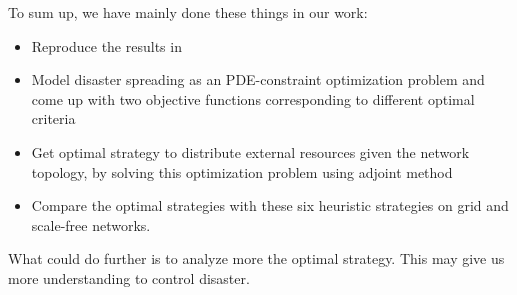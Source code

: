 To sum up, we have mainly done these things in our work:
\begin{itemize}
	\item Reproduce the results in \cite{buzna2007efficient}
	\item Model disaster spreading as an PDE-constraint optimization problem and come up with two objective functions corresponding to different optimal criteria
	\item Get optimal strategy to distribute external resources given the network topology, by solving this optimization problem using adjoint method
	\item Compare the optimal strategies with these six heuristic strategies on grid and scale-free networks. 
\end{itemize}

What could do further is to analyze more the optimal strategy. This may give us more understanding to control disaster.